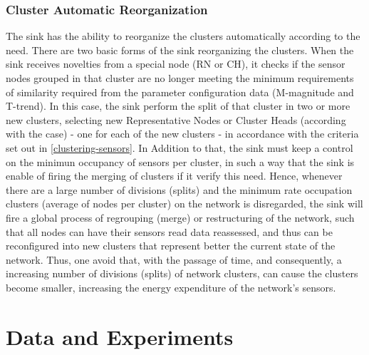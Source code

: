 \documentclass[conference]{IEEEtran}
\begin{document}
\subsubsection{Cluster Automatic Reorganization}

The sink has the ability to reorganize the clusters automatically according to
the need. There are two basic forms of the sink reorganizing the clusters. When
the sink receives novelties from a special node (RN or CH), it checks if the
sensor nodes grouped in that cluster are no longer meeting the minimum
requirements of similarity required from the parameter configuration data
(M-magnitude and T-trend). In this case, the sink perform the split of that
cluster in two or more new clusters, selecting new Representative Nodes or
Cluster Heads (according with the case) - one for each of the new clusters - in
accordance with the criteria set out in \ref{clustering-sensors}. In Addition to
that, the sink must keep a control on the minimun occupancy of sensors per
cluster, in such a way that the sink is enable of firing the merging of clusters
if it verify this need. Hence, whenever there are a large number of divisions
(splits) and the minimum rate occupation clusters (average of nodes per cluster)
on the network is disregarded, the sink will fire a global process of regrouping
(merge) or restructuring of the network, such that all nodes can have their
sensors read data reassessed, and thus can be reconfigured into new clusters
that represent better the current state of the network. Thus, one avoid that,
with the passage of time, and consequently, a increasing number of divisions
(splits) of network clusters, can cause the clusters become smaller, increasing
the energy expenditure of the network's sensors.


% 

\section{Data and Experiments}
\label{Data and Experiments}
\end{document}
